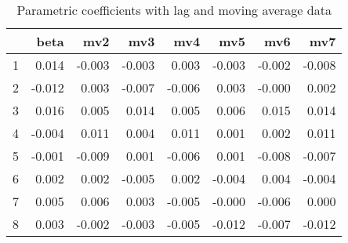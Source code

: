 \documentclass[a4paper, 12pt]{article}
\begin{document}
\begin{table}[h]
\centering
\caption{Parametric coefficients with lag and moving average data}
\begin{tabular}{rrrrrrrr}
  \hline
 & beta & mv2 & mv3 & mv4 & mv5 & mv6 & mv7 \\
  \hline
1 & 0.014 & -0.003 & -0.003 & 0.003 & -0.003 & -0.002 & -0.008 \\
  2 & -0.012 & 0.003 & -0.007 & -0.006 & 0.003 & -0.000 & 0.002 \\
  3 & 0.016 & 0.005 & 0.014 & 0.005 & 0.006 & 0.015 & 0.014 \\
  4 & -0.004 & 0.011 & 0.004 & 0.011 & 0.001 & 0.002 & 0.011 \\
  5 & -0.001 & -0.009 & 0.001 & -0.006 & 0.001 & -0.008 & -0.007 \\
  6 & 0.002 & 0.002 & -0.005 & 0.002 & -0.004 & 0.004 & -0.004 \\
  7 & 0.005 & 0.006 & 0.003 & -0.005 & -0.000 & -0.006 & 0.000 \\
  8 & 0.003 & -0.002 & -0.003 & -0.005 & -0.012 & -0.007 & -0.012 \\
   \hline
\end{tabular}
\end{table}
\clearpage
\end{document}
